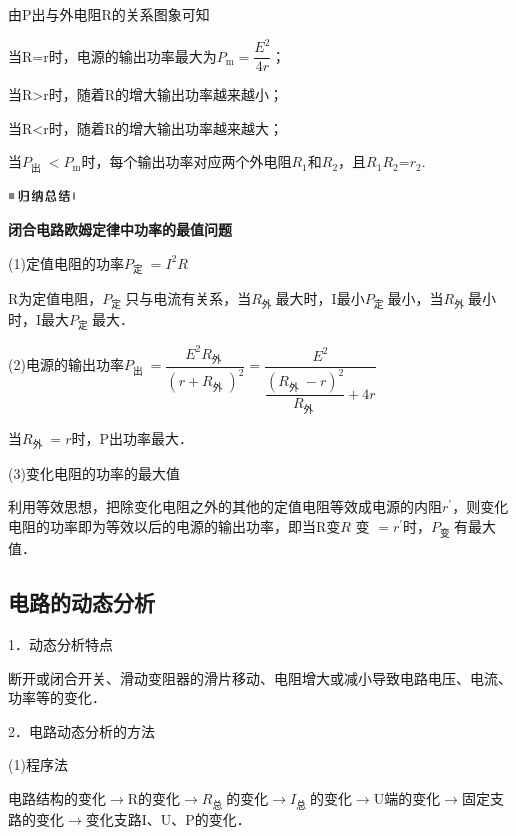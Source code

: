 \documentclass[cn,10.5pt,chinese,mac,chinesefont=founder]{elegantbook}
\begin{document}
由P出与外电阻R的关系图象可知

当R=r时，电源的输出功率最大为$P_{\mathrm{m}}=\dfrac{E^{2}}{4 r}$；

当R\textgreater r时，随着R的增大输出功率越来越小；

当R\textless r时，随着R的增大输出功率越来越大；

当$P_{\text {出 }}<P_{\mathrm{m}}$时，每个输出功率对应两个外电阻$R_1$和$R_2$，且$R_1$$R_2$=$r_2$.

\begin{center}\includegraphics[width=0.70764in,height=0.12292in]{media/image13.png}\end{center}
\begin{center}
	\textbf{闭合电路欧姆定律中功率的最值问题}
\end{center}

(1)定值电阻的功率$P_{\text {定 }}=I^{2} R$

R为定值电阻，$P_{\text {定 }}$只与电流有关系，当$R_{\text {外 }}$最大时，I最小$P_{\text {定 }}$最小，当$R_{\text {外 }}$最小时，I最大$P_{\text {定 }}$最大．

(2)电源的输出功率$P_{\text {出 }}=\dfrac{E^{2} R_{\text {外 }}}{\left(r+R_{\text {外 }}\right)^{2}}=\dfrac{E^{2}}{\dfrac{\left(R_{\text {外 }}-r\right)^{2}}{R_{\text {外 }}}+4 r}$

当$R_{\text {外 }}=r$时，P出功率最大．

(3)变化电阻的功率的最大值

利用等效思想，把除变化电阻之外的其他的定值电阻等效成电源的内阻$r^{\prime}$，则变化电阻的功率即为等效以后的电源的输出功率，即当R变$R$ 变 $=r^{\prime}$时，$P_{\text {变 }}$有最大值．

\newpage
\subsection{电路的动态分析}

1．动态分析特点

断开或闭合开关、滑动变阻器的滑片移动、电阻增大或减小导致电路电压、电流、功率等的变化．

2．电路动态分析的方法

(1)程序法

电路结构的变化$\rightarrow$R的变化$\rightarrow$$R_{\text {总 }}$的变化$\rightarrow$$I_{\text {总 }}$的变化$\rightarrow$U端的变化$\rightarrow$固定支路的变化$\rightarrow$变化支路I、U、P的变化．
\end{document}
